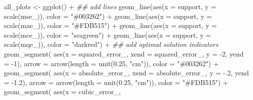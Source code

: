 \documentclass[
  letterpaper,
  DIV=11,
  numbers=noendperiod]{scrreprt}
\newenvironment{Shaded}{\begin{snugshade}}{\end{snugshade}}
\newcommand{\AttributeTok}[1]{\textcolor[rgb]{0.40,0.45,0.13}{#1}}
\newcommand{\DecValTok}[1]{\textcolor[rgb]{0.68,0.00,0.00}{#1}}
\newcommand{\DocumentationTok}[1]{\textcolor[rgb]{0.37,0.37,0.37}{\textit{#1}}}
\newcommand{\FloatTok}[1]{\textcolor[rgb]{0.68,0.00,0.00}{#1}}
\newcommand{\FunctionTok}[1]{\textcolor[rgb]{0.28,0.35,0.67}{#1}}
\newcommand{\NormalTok}[1]{\textcolor[rgb]{0.00,0.23,0.31}{#1}}
\newcommand{\OtherTok}[1]{\textcolor[rgb]{0.00,0.23,0.31}{#1}}
\newcommand{\SpecialCharTok}[1]{\textcolor[rgb]{0.37,0.37,0.37}{#1}}
\newcommand{\StringTok}[1]{\textcolor[rgb]{0.13,0.47,0.30}{#1}}
\begin{document}
\begin{Shaded}
\begin{Highlighting}[]
\NormalTok{all\_plots }\OtherTok{\textless{}{-}} \FunctionTok{ggplot}\NormalTok{() }\SpecialCharTok{+} 
  \DocumentationTok{\#\# add lines }
  \FunctionTok{geom\_line}\NormalTok{(}\FunctionTok{aes}\NormalTok{(}\AttributeTok{x =}\NormalTok{ support, }\AttributeTok{y =} \FunctionTok{scale}\NormalTok{(mse\_)), }\AttributeTok{color =} \StringTok{"\#003262"}\NormalTok{)  }\SpecialCharTok{+} 
  \FunctionTok{geom\_line}\NormalTok{(}\FunctionTok{aes}\NormalTok{(}\AttributeTok{x =}\NormalTok{ support, }\AttributeTok{y =} \FunctionTok{scale}\NormalTok{(mae\_)), }\AttributeTok{color =} \StringTok{"\#FDB515"}\NormalTok{)  }\SpecialCharTok{+} 
  \FunctionTok{geom\_line}\NormalTok{(}\FunctionTok{aes}\NormalTok{(}\AttributeTok{x =}\NormalTok{ support, }\AttributeTok{y =} \FunctionTok{scale}\NormalTok{(mce\_)), }\AttributeTok{color =} \StringTok{"seagreen"}\NormalTok{) }\SpecialCharTok{+} 
  \FunctionTok{geom\_line}\NormalTok{(}\FunctionTok{aes}\NormalTok{(}\AttributeTok{x =}\NormalTok{ support, }\AttributeTok{y =} \FunctionTok{scale}\NormalTok{(mqe\_)), }\AttributeTok{color =} \StringTok{"darkred"}\NormalTok{)  }\SpecialCharTok{+}
  \DocumentationTok{\#\# add optimal solution indicators}
  \FunctionTok{geom\_segment}\NormalTok{(}
    \FunctionTok{aes}\NormalTok{(}\AttributeTok{x =}\NormalTok{ squared\_error\_, }
    \AttributeTok{xend =}\NormalTok{ squared\_error\_, }
    \AttributeTok{y =} \SpecialCharTok{{-}}\DecValTok{2}\NormalTok{, }
    \AttributeTok{yend =} \SpecialCharTok{{-}}\DecValTok{1}\NormalTok{), }
    \AttributeTok{arrow =} \FunctionTok{arrow}\NormalTok{(}\AttributeTok{length =} \FunctionTok{unit}\NormalTok{(}\FloatTok{0.25}\NormalTok{, }\StringTok{"cm"}\NormalTok{)),}
    \AttributeTok{color =} \StringTok{"\#003262"}\NormalTok{)  }\SpecialCharTok{+} 
  \FunctionTok{geom\_segment}\NormalTok{(}
    \FunctionTok{aes}\NormalTok{(}\AttributeTok{x =}\NormalTok{ absolute\_error\_, }
    \AttributeTok{xend =}\NormalTok{ absolute\_error\_, }
    \AttributeTok{y =} \SpecialCharTok{{-}}\NormalTok{.}\DecValTok{2}\NormalTok{, }
    \AttributeTok{yend =} \SpecialCharTok{{-}}\FloatTok{1.2}\NormalTok{), }
    \AttributeTok{arrow =} \FunctionTok{arrow}\NormalTok{(}\AttributeTok{length =} \FunctionTok{unit}\NormalTok{(}\FloatTok{0.25}\NormalTok{, }\StringTok{"cm"}\NormalTok{)),}
    \AttributeTok{color =} \StringTok{"\#FDB515"}\NormalTok{)  }\SpecialCharTok{+} 
  \FunctionTok{geom\_segment}\NormalTok{(}
    \FunctionTok{aes}\NormalTok{(}\AttributeTok{x =}\NormalTok{ cubic\_error\_, }

\end{Highlighting}
\end{Shaded}
\end{document}
